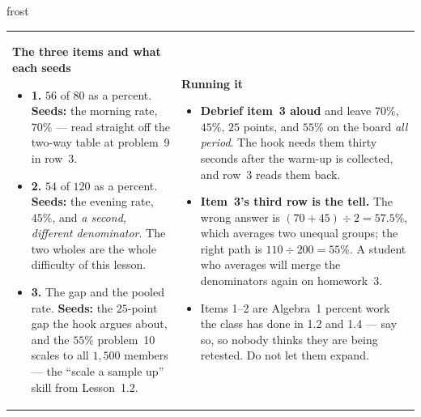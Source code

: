 \documentclass[10pt]{article}
\begin{document}
\begin{fixedskillbox}{frost}
\begin{tabularx}{\linewidth}{@{}X X@{}}
\begin{minipage}[t]{\linewidth}\vspace{0pt}
    \textbf{The three items and what each seeds}
    \begin{itemize}[leftmargin=1.1em, itemsep=1pt, topsep=2pt]
      \item \textbf{1.} $56$ of $80$ as a percent. \textbf{Seeds:} the morning rate, $70\%$ ---
            read straight off the two-way table at problem~9 in row~3.
      \item \textbf{2.} $54$ of $120$ as a percent. \textbf{Seeds:} the evening rate, $45\%$,
            and \emph{a second, different denominator}. The two wholes are the whole
            difficulty of this lesson.
      \item \textbf{3.} The gap and the pooled rate. \textbf{Seeds:} the $25$-point gap the
            hook argues about, and the $55\%$ problem~10 scales to all $1{,}500$ members ---
            the ``scale a sample up'' skill from Lesson~1.2.
    \end{itemize}
\end{minipage}
&
\begin{minipage}[t]{\linewidth}\vspace{0pt}
    \textbf{Running it}
    \begin{itemize}[leftmargin=1.1em, itemsep=1pt, topsep=2pt]
      \item \textbf{Debrief item~3 aloud} and leave $70\%$, $45\%$, $25$ points, and $55\%$
            on the board \emph{all period}. The hook needs them thirty seconds after the
            warm-up is collected, and row~3 reads them back.
      \item \textbf{Item~3's third row is the tell.} The wrong answer is $(70+45)\div 2 =
            57.5\%$, which averages two unequal groups; the right path is $110\div 200 =
            55\%$. A student who averages will merge the denominators again on homework~3.
      \item Items 1--2 are Algebra~1 percent work the class has done in 1.2 and 1.4 --- say
            so, so nobody thinks they are being retested. Do not let them expand.
    \end{itemize}
\end{minipage}
\end{tabularx}
\end{fixedskillbox}
\end{document}
